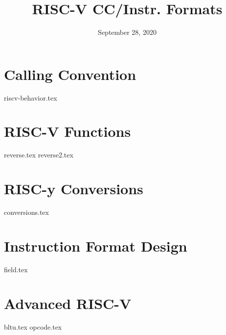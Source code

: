 \documentclass{exam}
\title{RISC-V CC/Instr. Formats}
\date{September 28, 2020}
\begin{document}
\maketitle


\section{Calling Convention}
\begin{questions}
{riscv-behavior.tex}
\end{questions}

\section{RISC-V Functions}
\begin{questions}
{reverse.tex}
{reverse2.tex}
\end{questions}

\section{RISC-y Conversions}
\begin{questions}
{conversions.tex}
\end{questions}
\nopagebreak[0]

\section{Instruction Format Design}
\begin{questions}
{field.tex}
\end{questions}

\section{Advanced RISC-V}
\begin{questions}
{bltu.tex}
{opcode.tex}
\end{questions}
\end{document}

